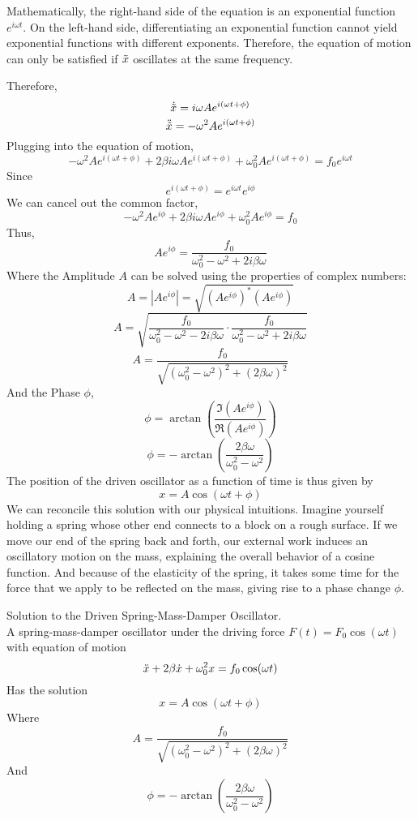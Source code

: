 \documentclass[11pt]{article}
\theoremstyle{gangnamstyle}{\newtheorem{definition}{Definition}[]}
\theoremstyle{gangnamstyle}{\newtheorem{example}{Example}[]}
\theoremstyle{gangnamstyle}{\newtheorem{problem}{Problem}[]}
\theoremstyle{gangnamstyle}{\newtheorem{warning}{Warning}[]}
\begin{document}
Mathematically, the right-hand side of the equation is an exponential function $e^{i\omega t}$. On the left-hand side, differentiating an exponential function cannot yield exponential functions with different exponents. Therefore, the equation of motion can only be satisfied if $\Tilde{x}$ oscillates at the same frequency. 

Therefore, 
\[ \Dot{\Tilde{x}} = i\omega Ae^{i(\omega t + \phi)} \]
\[ \Ddot{\Tilde{x}} = -\omega^2 Ae^{i(\omega t + \phi)} \]
Plugging into the equation of motion, 
\[ -\omega^2 Ae^{i(\omega t + \phi)} + 2\beta i\omega Ae^{i(\omega t + \phi)} + \omega_0^2 Ae^{i(\omega t + \phi)} = f_0e^{i\omega t} \]
Since 
\[ e^{i(\omega t + \phi)} = e^{i\omega t}e^{i\phi} \]
We can cancel out the common factor, 
\[ -\omega^2 Ae^{i\phi} + 2\beta i\omega Ae^{i\phi} + \omega_0^2 Ae^{i\phi} = f_0 \]
Thus, 
\[ Ae^{i\phi} = \frac{f_0}{\omega_0^2 - \omega^2 + 2i\beta\omega} \]
Where the Amplitude $A$ can be solved using the properties of complex numbers: 
\[ A = |Ae^{i\phi}| = \sqrt{(Ae^{i\phi})^*(Ae^{i\phi})} \]
\[ A = \sqrt{\frac{f_0}{\omega_0^2 - \omega^2 - 2i\beta\omega} \cdot \frac{f_0}{\omega_0^2 - \omega^2 + 2i\beta\omega}} \]
\[ A = \frac{f_0}{\sqrt{(\omega_0^2 - \omega^2)^2 + (2\beta\omega)^2}} \]
And the Phase $\phi$,
\[ \phi = \arctan(\frac{\Im(Ae^{i\phi})}{\Re(Ae^{i\phi})}) \]
\[ \phi = -\arctan(\frac{2\beta\omega}{\omega_0^2 - \omega^2}) \]
The position of the driven oscillator as a function of time is thus given by
\[ x = A\cos(\omega t + \phi) \]
We can reconcile this solution with our physical intuitions. Imagine yourself holding a spring whose other end connects to a block on a rough surface. If we move our end of the spring back and forth, our external work induces an oscillatory motion on the mass, explaining the overall behavior of a cosine function. And because of the elasticity of the spring, it takes some time for the force that we apply to be reflected on the mass, giving rise to a phase change $\phi$. 

\begin{definition}
Solution to the Driven Spring-Mass-Damper Oscillator. \\
A spring-mass-damper oscillator under the driving force $F(t) = F_0\cos(\omega t)$ with equation of motion
\begin{equation}
\Ddot{x} + 2\beta\Dot{x} + \omega_0^2x = f_0\cos(\omega t)
\end{equation}
Has the solution
\begin{equation}
x = A\cos(\omega t + \phi)
\end{equation}
Where
\begin{equation}
A = \frac{f_0}{\sqrt{(\omega_0^2 - \omega^2)^2 + (2\beta\omega)^2}}
\end{equation}
And
\begin{equation}
\phi = -\arctan(\frac{2\beta\omega}{\omega_0^2 - \omega^2})
\end{equation}
\end{definition}
\end{document}

